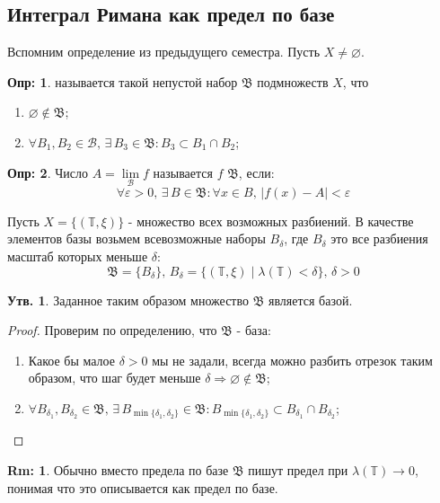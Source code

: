 \documentclass[12pt]{article}
\newcommand{\MTB}{\mathbb{T}}
\newcommand{\VN}{\varnothing}
\theoremstyle{definition}
\newtheorem{defn}{Опр:}
\newtheorem{rem}{Rm:}
\newtheorem{prop}{Утв.}
\begin{document}
\subsection*{Интеграл Римана как предел по базе}
Вспомним определение из предыдущего семестра. Пусть $X \neq \varnothing$.
\begin{defn}
	 называется такой непустой набор $\mathfrak{B}$ подмножеств $X$, что 
	\begin{enumerate}[label={(\arabic*)}]
		\item $\varnothing \notin \mathfrak{B}$;
		\item $\forall B_1, B_2 \in \mathcal{B},\, \exists \, B_3 \in \mathfrak{B} \colon B_3 \subset B_1 \cap B_2$;
	\end{enumerate}
\end{defn}
\begin{defn}
	Число $A = \lim\limits_{\mathcal{B}}f$ называется  $f$  $\mathfrak{B}$, если:
	$$
		\forall \varepsilon > 0, \, \exists \, B \in \mathfrak{B} \colon \forall x \in B, \, |f(x) - A| < \varepsilon
	$$ 
\end{defn}
Пусть $X = \{(\MTB, \xi)\}$ - множество всех возможных разбиений. В качестве элементов базы возьмем всевозможные наборы $B_\delta$, где $B_\delta$ это все разбиения масштаб которых меньше $\delta$: 
$$
	\mathfrak{B} = \{B_\delta\}, \, B_\delta = \{(\MTB, \xi)\mid \lambda(\MTB) < \delta \}, \, \delta > 0
$$
\begin{prop}
	Заданное таким образом множество $\mathfrak{B}$ является базой.
\end{prop}
\begin{proof}
	Проверим по определению, что $\mathfrak{B}$ - база:
	\begin{enumerate}[label={(\arabic*)}]
		\item Какое бы малое $\delta > 0$ мы не задали, всегда можно разбить отрезок таким образом, что шаг будет меньше $\delta \Rightarrow \VN \notin \mathfrak{B}$;
		\item $\forall B_{\delta_1}, B_{\delta_2} \in \mathfrak{B},\, \exists \, B_{\min\{\delta_1,\delta_2\}} \in \mathfrak{B} \colon B_{\min\{\delta_1,\delta_2\}} \subset B_{\delta_1} \cap B_{\delta_2}$;
	\end{enumerate}
\end{proof}
\begin{rem}
	Обычно вместо предела по базе $\mathfrak{B}$ пишут предел при $\lambda(\MTB) \to 0$, понимая что это описывается как предел по базе.
\end{rem}
\end{document}
